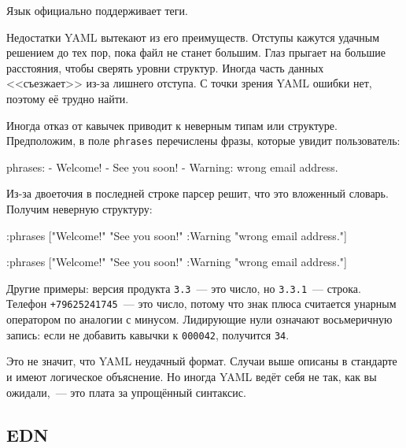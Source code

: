 Язык официально поддерживает теги.


Недостатки YAML вытекают из его преимуществ. Отступы кажутся удачным решением до
тех пор, пока файл не станет большим. Глаз прыгает на большие расстояния, чтобы
сверять уровни структур. Иногда часть данных <<съезжает>> из-за лишнего
отступа. С точки зрения YAML ошибки нет, поэтому её трудно найти.

Иногда отказ от кавычек приводит к неверным типам или структуре. Предположим, в
поле \verb|phrases| перечислены фразы, которые увидит пользователь:

\begin{english}
  \begin{yaml}
phrases:
  - Welcome!
  - See you soon!
  - Warning: wrong email address.
  \end{yaml}
\end{english}

Из-за двоеточия в последней строке парсер решит, что это вложенный
словарь. Получим неверную структуру:

\ifx\devicetype\mobile

\begin{english}
  \begin{clojure}
{:phrases
 ["Welcome!"
  "See you soon!"
  {:Warning "wrong email address."}]}
  \end{clojure}
\end{english}

\else

\begin{english}
  \begin{clojure}
{:phrases ["Welcome!"
           "See you soon!"
           {:Warning "wrong email address."}]}
  \end{clojure}
\end{english}

\fi

Другие примеры: версия продукта \verb|3.3|~--- это число, но \verb|3.3.1|~---
строка. Телефон \verb|+79625241745|~--- это число, потому что знак плюса считается
унарным оператором по аналогии с минусом. Лидирующие нули означают восьмеричную
запись: если не добавить кавычки к \verb|000042|, получится \verb|34|.

Это не значит, что YAML неудачный формат. Случаи выше описаны в стандарте и
имеют логическое объяснение. Но иногда YAML ведёт себя не так, как вы
ожидали,~--- это плата за упрощённый синтаксис.

\subsection{EDN}

